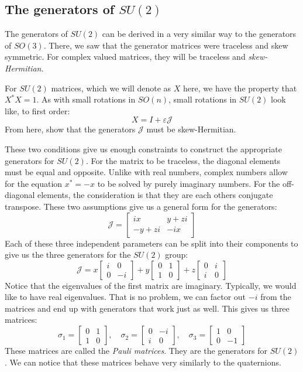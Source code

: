 \subsection{The generators of $SU(2)$}
The generators of $SU(2)$ can be derived in a very similar way to the generators of $SO(3)$. There, we saw that the generator matrices were traceless and skew symmetric. For complex valued matrices, they will be traceless and \textit{skew-Hermitian}.
\begin{exercise}
For $SU(2)$ matrices, which we will denote as $X$ here, we have the property that $X^*X=1$. As with small rotations in $SO(n)$, small rotations in $SU(2)$ look like, to first order:
$$X=I+\varepsilon \mathcal{J}$$
From here, show that the generators $\mathcal{J}$ must be skew-Hermitian.
\end{exercise}
These two conditions give us enough constraints to construct the appropriate generators for $SU(2)$. For the matrix to be traceless, the diagonal elements must be equal and opposite. Unlike with real numbers, complex numbers allow for the equation $x^*=-x$ to be solved by purely imaginary numbers. For the off-diagonal elements, the consideration is that they are each others conjugate transpose. These two assumptions give us a general form for the generators:
$$\mathcal{J}=\begin{bmatrix}
ix&y+zi\\-y+zi&-ix
\end{bmatrix}$$
Each of these three independent parameters can be split into their components to give us the three generators for the $SU(2)$ group:
$$\mathcal{J}=x\begin{bmatrix}
i&0\\0&-i
\end{bmatrix}+y\begin{bmatrix}
0&1\\1&0
\end{bmatrix}+z\begin{bmatrix}
0&i\\i&0
\end{bmatrix}$$
Notice that the eigenvalues of the first matrix are imaginary. Typically, we would like to have real eigenvalues. That is no problem, we can factor out  $-i$ from the matrices and end up with generators that work just as well. This gives us three matrices:
$$\sigma_1=\begin{bmatrix}
    0&1\\1&0
\end{bmatrix},\quad \sigma_2=\begin{bmatrix}
    0&-i\\i&0
\end{bmatrix},\quad\sigma_3=\begin{bmatrix}
    1&0\\0&-1
\end{bmatrix}$$
These matrices are called the \textit{Pauli matrices}. They are the generators for $SU(2)$. We can notice that these matrices behave very similarly to the quaternions. 

